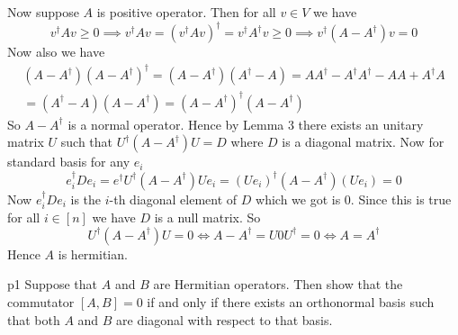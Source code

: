 \documentclass[a4paper, 11pt]{article}
\begin{document}
{\begin{itemize}
	Now suppose $A$ is positive operator. Then for all $v\in V$ we have $$v^{\dagger}Av\geq 0\implies v^{\dagger}Av= (v^{\dagger}Av)^{\dagger}=v^{\dagger}A^{\dagger}v\geq 0\implies v^{\dagger}(A-A^{\dagger})v=0$$Now also we have \begin{multline*}
		(A-A^{\dagger})(A-A^{\dagger})^{\dagger}=(A-A^{\dagger})(A^{\dagger}-A)=AA^{\dagger}-A^{\dagger}A^{\dagger}-AA+A^{\dagger}A\\
		=(A^{\dagger}-A)(A-A^{\dagger})=(A-A^{\dagger})^{\dagger}(A-A^{\dagger})
	\end{multline*}So $A-A^{\dagger}$ is a normal operator. Hence by Lemma 3 there exists an unitary matrix $U$ such that $U^{\dagger}(A-A^{\dagger})U=D$ where $D$ is a diagonal matrix. Now for standard basis for any $e_i$ $$e_i^{\dagger}De_i=e^{\dagger}U^{\dagger}(A-A^{\dagger})Ue_i=(Ue_i)^{\dagger}(A-A^{\dagger})(Ue_i)= 0$$ Now $e_i^{\dagger}De_i$ is the $i$-th diagonal element of $D$ which we got is 0. Since this is true for all $i\in [n]$ we have $D$ is a null matrix. So $$U^{\dagger}(A-A^{\dagger})U=0\iff A-A^{\dagger}=U0U^{\dagger}=0\iff A=A^{\dagger}$$Hence $A$ is hermitian.
	\end{itemize}
}



\begin{problem}{%
	}{p1%
	}
	Suppose that $A$ and $B$ are Hermitian operators. Then show that the commutator $[A, B] = 0$ if and only if there exists an orthonormal basis such that both $A$ and $B$ are diagonal with respect to that basis. 
\end{problem}
\end{document}
